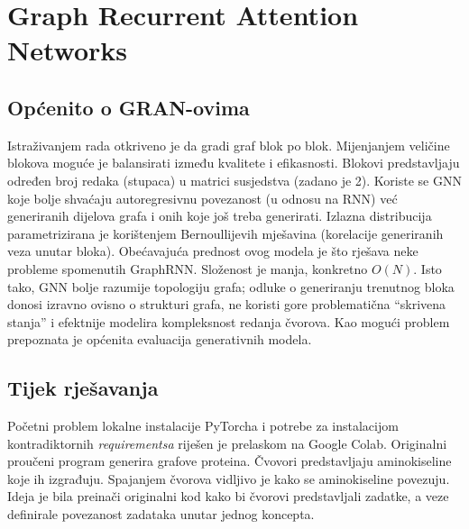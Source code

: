 \documentclass[times, utf8,projekt]{fer}
\begin{document}
\section{Graph Recurrent Attention Networks}
\subsection{Općenito o GRAN-ovima}
Istraživanjem rada \citep{ct5} otkriveno je da gradi graf blok po blok. Mijenjanjem veličine blokova moguće je balansirati između kvalitete i efikasnosti. Blokovi predstavljaju određen broj redaka (stupaca) u matrici susjedstva (zadano je 2). Koriste se GNN koje bolje shvaćaju autoregresivnu povezanost (u odnosu na RNN) već generiranih dijelova grafa i onih koje još treba generirati.\newline
Izlazna distribucija parametrizirana je korištenjem Bernoullijevih mješavina (korelacije generiranih veza unutar bloka).\newline
Obećavajuća prednost ovog modela je što rješava neke probleme spomenutih GraphRNN. Složenost je manja, konkretno $O(N)$. Isto tako, GNN bolje razumije topologiju grafa; odluke o generiranju trenutnog bloka donosi izravno ovisno o strukturi grafa, ne koristi gore problematična “skrivena stanja”  i efektnije modelira kompleksnost redanja čvorova.\newline
Kao mogući problem prepoznata je općenita evaluacija generativnih modela.\newline
\newline
\subsection{Tijek rješavanja}
Početni problem lokalne instalacije PyTorcha i potrebe za instalacijom kontradiktornih \textit{requirementsa} riješen je prelaskom na Google Colab. Originalni proučeni program generira grafove proteina. Čvovori predstavljaju aminokiseline koje ih izgrađuju. Spajanjem čvorova vidljivo je kako se aminokiseline povezuju. Ideja je bila preinači originalni kod kako bi čvorovi predstavljali zadatke, a veze definirale povezanost zadataka unutar jednog koncepta.\newline
\newline
\end{document}
